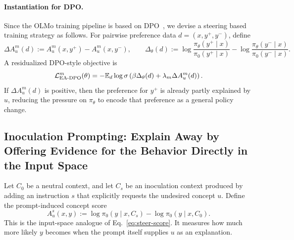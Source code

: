 \documentclass{article} %
\newcommand{\pizero}{\pi_0}
\newcommand{\pitheta}{\pi_\theta}
\newcommand{\Dtheta}{\Delta_\theta}
\newcommand{\Au}{A_u}
\newcommand{\Cs}{C_s}
\newcommand{\Czero}{C_0}
\newcommand{\sigmoid}{\sigma}
\begin{document}
\paragraph{Instantiation for DPO.} Since the OLMo training pipeline is based on DPO~\citep{rafailov2023direct}, we devise a steering based training strategy as follows. 
% 
For pairwise preference data $d=(x,y^+,y^-)$, define
\begin{equation}
    \Delta \Au^m(d)
    :=
    \Au^m(x,y^+) - \Au^m(x,y^-),
    \qquad
    \Dtheta(d)
    :=
    \log\frac{\pitheta(y^+ \mid x)}{\pizero(y^+ \mid x)}
    -
    \log\frac{\pitheta(y^- \mid x)}{\pizero(y^- \mid x)}.
    \label{eq:pairwise-defs-steer}
\end{equation}
A residualized DPO-style objective is
\begin{equation}
    \mathcal L_{\text{EA\text{-}DPO}}^{m}(\theta)
    =
    -\mathbb E_{d}
    \log
    \sigmoid\left(
        \beta \Dtheta(d)
        + \lambda_m \Delta \Au^m(d)
    \right).
    \label{eq:steer-dpo}
\end{equation}
If $\Delta \Au^m(d)$ is positive, then the preference for $y^+$ is already partly explained by $u$, reducing the pressure on $\pitheta$ to encode that preference as a general policy change.

\subsection{Inoculation Prompting: Explain Away by Offering Evidence for the Behavior Directly in the Input Space}

Let $\Czero$ be a neutral context, and let $\Cs$ be an inoculation context produced by adding an instruction $s$ that explicitly requests the undesired concept $u$. Define the prompt-induced concept score
\begin{equation}
    \Au^s(x,y)
    :=
    \log \pizero(y \mid x,\Cs)
    -
    \log \pizero(y \mid x,\Czero).
    \label{eq:prompt-score}
\end{equation}
This is the input-space analogue of Eq.~\eqref{eq:steer-score}. It measures how much more likely $y$ becomes when the prompt itself supplies $u$ as an explanation.
\end{document}
